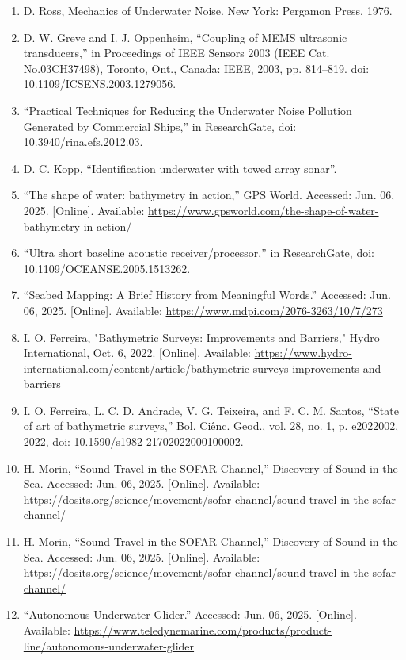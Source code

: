 \documentclass{article}
\begin{document}
\begin{sloppypar}
\begin{enumerate}
    \item{D. Ross, Mechanics of Underwater Noise. New York: Pergamon Press, 1976.}

    \item{D. W. Greve and I. J. Oppenheim, “Coupling of MEMS ultrasonic transducers,” in Proceedings of IEEE Sensors 2003 (IEEE Cat. No.03CH37498), Toronto, Ont., Canada: IEEE, 2003, pp. 814–819. doi: 10.1109/ICSENS.2003.1279056.}

    \item{“Practical Techniques for Reducing the Underwater Noise Pollution Generated by Commercial Ships,” in ResearchGate, doi: 10.3940/rina.efs.2012.03.}

    \item{D. C. Kopp, “Identification underwater with towed array sonar”.}

    \item{“The shape of water: bathymetry in action,” GPS World. Accessed: Jun. 06, 2025. [Online]. Available: \url{https://www.gpsworld.com/the-shape-of-water-bathymetry-in-action/}}


    \item{“Ultra short baseline acoustic receiver/processor,” in ResearchGate, doi: 10.1109/OCEANSE.2005.1513262.}

    \item{“Seabed Mapping: A Brief History from Meaningful Words.” Accessed: Jun. 06, 2025. [Online]. Available: \url{https://www.mdpi.com/2076-3263/10/7/273}}

    \item{I. O. Ferreira, "Bathymetric Surveys: Improvements and Barriers," Hydro International, Oct. 6, 2022. [Online]. Available: \url{https://www.hydro-international.com/content/article/bathymetric-surveys-improvements-and-barriers}}

    \item{I. O. Ferreira, L. C. D. Andrade, V. G. Teixeira, and F. C. M. Santos, “State of art of bathymetric surveys,” Bol. Ciênc. Geod., vol. 28, no. 1, p. e2022002, 2022, doi: 10.1590/s1982-21702022000100002.}

    \item{H. Morin, “Sound Travel in the SOFAR Channel,” Discovery of Sound in the Sea. Accessed: Jun. 06, 2025. [Online]. Available: \url{https://dosits.org/science/movement/sofar-channel/sound-travel-in-the-sofar-channel/}}

    \item{H. Morin, “Sound Travel in the SOFAR Channel,” Discovery of Sound in the Sea. Accessed: Jun. 06, 2025. [Online]. Available: \url{https://dosits.org/science/movement/sofar-channel/sound-travel-in-the-sofar-channel/}}

    \item{“Autonomous Underwater Glider.” Accessed: Jun. 06, 2025. [Online]. Available: \url{https://www.teledynemarine.com/products/product-line/autonomous-underwater-glider}}

\end{enumerate}
\end{sloppypar}

\end{document}
